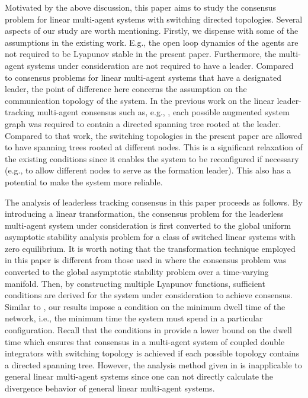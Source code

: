 \documentclass[letterpaper, 10 pt, conference]{ieeeconf}
\begin{document}
 \par

Motivated by the above discussion, this paper aims to study the consensus
problem for linear multi-agent systems with switching directed
topologies. Several aspects of our study are worth mentioning. Firstly, we
dispense with some of the assumptions in the existing work. E.g., the open
loop dynamics of the agents are not required to be Lyapunov stable
in the present paper. Furthermore, the multi-agent systems under
consideration are not required to have a leader. Compared to
consensus problems for linear multi-agent systems that have a
designated leader, the point of difference here concerns the assumption on
the communication topology of the system. In the previous work on
the linear leader-tracking multi-agent consensus such as, e.g.,
\cite{WenHuYuChenCaoSCL2013}, each possible augmented system graph was
required to contain a directed spanning tree rooted at the leader. Compared
to that work, the switching topologies in the present paper are allowed to
have spanning trees rooted at different nodes. This is a significant
relaxation of the existing conditions since it enables the system to be
reconfigured if necessary (e.g., to allow different nodes to serve as the
formation leader). This also has a potential to make the system more
reliable.

The analysis of leaderless tracking consensus in this paper proceeds as
follows. By introducing a linear transformation, the consensus problem for
the leaderless multi-agent system under consideration is first converted to
the global uniform asymptotic stability analysis problem for a class of
switched linear systems with zero equilibrium. It is worth noting that the
transformation technique employed in this paper is different from those
used in \cite{MinyiHuangTAC,WenwuYuSMCB} where the consensus problem was
converted to the global asymptotic stability problem over a time-varying
manifold.  Then, by constructing multiple Lyapunov functions,
sufficient conditions are derived for the system under consideration to
achieve consensus. Similar to \cite{RenBeard2008Book}, our
results impose a condition on the minimum dwell time of the network, i.e.,
the minimum time the system must spend in a particular
configuration. Recall that the conditions in \cite{RenBeard2008Book}
provide a lower bound on the dwell time which ensures that consensus in
a multi-agent system of coupled double integrators with switching topology
is achieved if each possible topology contains a directed spanning
tree. However, the analysis method given in \cite{RenBeard2008Book} is
inapplicable to general linear multi-agent
systems since one can not directly calculate the divergence behavior of
general linear multi-agent systems.
\end{document}
